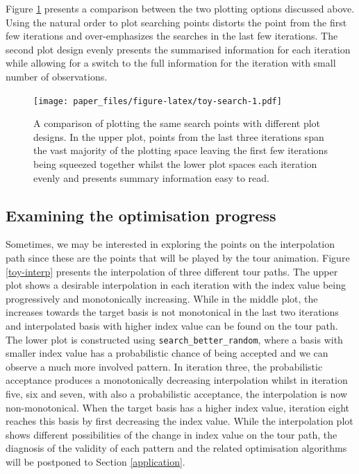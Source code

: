 \documentclass[12pt]{article}
\begin{document}
Figure \ref{toy-search} presents a comparison between the two plotting options discussed above. Using the natural order to plot searching points distorts the point from the first few iterations and over-emphasizes the searches in the last few iterations. The second plot design evenly presents the summarised information for each iteration while allowing for a switch to the full information for the iteration with small number of observations.

\begin{figure}
\centering
\texttt{[image: paper\_files/figure-latex/toy-search-1.pdf]}
\caption{\label{fig:toy-search}\label{toy-search}A comparison of plotting the same search points with different plot designs. In the upper plot, points from the last three iterations span the vast majority of the plotting space leaving the first few iterations being squeezed together whilst the lower plot spaces each iteration evenly and presents summary information easy to read.}
\end{figure}

\hypertarget{examining-the-optimisation-progress}{%
\subsection{Examining the optimisation progress}\label{examining-the-optimisation-progress}}

Sometimes, we may be interested in exploring the points on the interpolation path since these are the points that will be played by the tour animation. Figure \ref{toy-interp} presents the interpolation of three different tour paths. The upper plot shows a desirable interpolation in each iteration with the index value being progressively and monotonically increasing. While in the middle plot, the increases towards the target basis is not monotonical in the last two iterations and interpolated basis with higher index value can be found on the tour path. The lower plot is constructed using \texttt{search\_better\_random}, where a basis with smaller index value has a probabilistic chance of being accepted and we can observe a much more involved pattern. In iteration three, the probabilistic acceptance produces a monotonically decreasing interpolation whilst in iteration five, six and seven, with also a probabilistic acceptance, the interpolation is now non-monotonical. When the target basis has a higher index value, iteration eight reaches this basis by first decreasing the index value. While the interpolation plot shows different possibilities of the change in index value on the tour path, the diagnosis of the validity of each pattern and the related optimisation algorithms will be postponed to Section \ref{application}.
\end{document}

